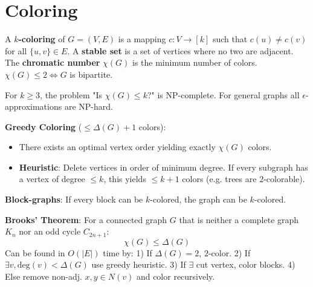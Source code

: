 \section{Coloring}

\begin{definition}
A \textbf{$k$-coloring} of $G = (V, E)$ is a mapping $c: V \to [k]$ such that $c(u) \neq c(v)$ for all $\{u,v\} \in E$.
A \textbf{stable set} is a set of vertices where no two are adjacent.
The \textbf{chromatic number} $\chi(G)$ is the minimum number of colors.
$\chi(G) \le 2 \iff G$ is bipartite.
\end{definition}

\begin{theorem}
For $k \ge 3$, the problem "Is $\chi(G) \le k$?" is NP-complete. For general graphs all $\epsilon$-approximations are NP-hard.
\end{theorem}

\begin{algorithm}
\textbf{Greedy Coloring} ($\le \Delta(G) + 1$ colors):
\begin{itemize}
    \item There exists an optimal vertex order yielding exactly $\chi(G)$ colors.
    \item \textbf{Heuristic}: Delete vertices in order of minimum degree. If every subgraph has a vertex of degree $\le k$, this yields $\le k+1$ colors (e.g. trees are $2$-colorable).
\end{itemize}
\textbf{Block-graphs}: If every block can be $k$-colored, the graph can be $k$-colored.
\end{algorithm}

\begin{theorem}
\textbf{Brooks' Theorem}: For a connected graph $G$ that is neither a complete graph $K_n$ nor an odd cycle $C_{2n+1}$:
$$\chi(G) \le \Delta(G)$$
Can be found in $O(|E|)$ time by: 1) If $\Delta(G)=2$, $2$-color. 2) If $\exists v, \text{deg}(v) < \Delta(G)$ use greedy heuristic. 3) If $\exists$ cut vertex, color blocks. 4) Else remove non-adj. $x,y \in N(v)$ and color recursively.
\end{theorem}
